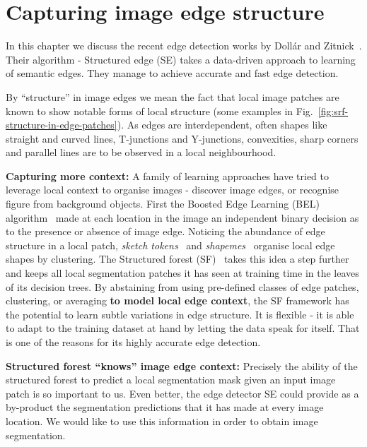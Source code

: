 \chapter{Capturing image edge structure} %
\label{Chapter2}
In this chapter we discuss the recent edge detection works by Doll\'ar and Zitnick~\cite{DollarICCV13edges,Dollar2014fast}. Their algorithm - Structured edge (SE) takes a data-driven approach to learning of semantic edges. %
They manage to achieve accurate and fast edge detection. %

By ``structure'' in image edges %
we mean the fact that local image patches are known \cite{Ren2006figure,LimZD13} to show %
notable %
forms of local structure (some examples in Fig.~\ref{fig:srf-structure-in-edge-patches}). As edges are interdependent, often shapes like straight and curved lines, T-junctions and Y-junctions, convexities, sharp corners and parallel lines are to be observed in a local neighbourhood.

\textbf{Capturing more context:} A family of learning approaches have tried to leverage local context to organise images - discover image edges, or recognise %
figure from background objects. First the Boosted Edge Learning (BEL) algorithm~\cite{dollar2006supervised} made at each location in the image an independent binary decision as to the presence or absence of image edge. Noticing the abundance of edge structure in a local patch, \textit{sketch tokens}~\cite{LimZD13} and \textit{shapemes}~\cite{Ren2006figure} organise local edge shapes by clustering. The Structured forest (SF)~\cite{DollarICCV13edges} takes this idea a step further and keeps all local segmentation patches it has seen at training time in the leaves of its decision trees. By abstaining from using pre-defined classes of edge patches, clustering, or averaging \textbf{to model local edge context}, the SF framework has the potential to learn subtle variations in edge structure. It is flexible - it is able to adapt to the training dataset at hand by letting the data speak for itself. That is one of the reasons for its highly accurate edge detection.

\textbf{Structured forest ``knows'' image edge context:} Precisely the ability of the structured forest to predict a local segmentation mask given an input image patch is so important to us. Even better, the edge detector SE could provide as a by-product the segmentation predictions that it has made at every image location. We would like to use this information in order to obtain image segmentation.

